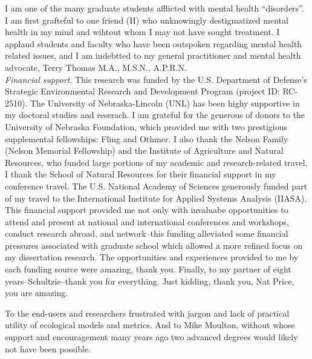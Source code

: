 \documentclass[12pt,twoside,openany]{reedthesis}
\begin{document}
\begin{acknowledgements}
    I am one of the many graduate students afflicted with mental health ``disorders''. I am first grafteful to one friend (H) who unknowingly destigmatized mental health in my mind and wihtout whom I may not have sought treatment. I applaud students and faculty who have been outspoken regarding mental health related issues, and I am indebtted to my general practitioner and mental health advocate, Terry Thomas M.A., M.S.N., A.P.R.N.\\
    \emph{Financial support}. This research was funded by the U.S. Department of Defense's Strategic Environmental Research and Development Program (project ID: RC-2510). The University of Nebraska-Lincoln (UNL) has been highy supportive in my doctoral studies and reserach. I am grateful for the generous of donors to the University of Nebraska Foundation, which provided me with two prestigious supplemental fellowships: Fling and Othmer. I also thank the Nelson Family (Nelson Memorial Fellowship) and the Institute of Agriculture and Natural Resources, who funded large portions of my academic and research-related travel. I thank the School of Natural Resources for their financial support in my conference travel. The U.S. National Academy of Sciences generously funded part of my travel to the International Institute for Applied Systems Analysis (IIASA). This financial support provided me not only with invaluabe opportunities to attend and present at national and international conferences and workshops, conduct research abroad, and network--this funding alleviated some financial pressures associated with graduate school which allowed a more refined focus on my dissertation research. The opportunities and experiences provided to me by each funding source were amazing, thank you.
    Finally, to my partner of eight years--Schultzie--thank you for everything. Just kidding, thank you, Nat Price, you are amazing.
  \end{acknowledgements}

  \hypersetup{linkcolor=black}
  \setcounter{tocdepth}{2}
  \tableofcontents

  \listoftables

  \listoffigures

  \begin{dedication}
    To the end-users and researchers frustrated with jargon and lack of practical utility of ecological models and metrics. And to Mike Moulton, without whose support and encouragement many years ago two advanced degrees would likely not have been possible.
  \end{dedication}
\mainmatter %
\pagestyle{fancyplain} %
\linespread{1} %
\end{document}
